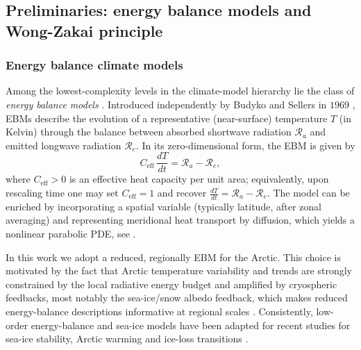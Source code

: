 \documentclass[10pt]{amsart}
\numberwithin{equation}{section}
\begin{document}
\subsection{Preliminaries: energy balance models and Wong-Zakai principle}
\label{subsec: preliminaries}
\subsubsection{Energy balance climate models}
Among the lowest-complexity levels in the climate-model hierarchy lie the class of \emph{energy balance models}
\cite{North17}. Introduced independently by Budyko and Sellers in $1969$ \cite{Budyko1969,Sellers1969}, EBMs describe the evolution of a representative (near-surface) temperature
$T$ (in Kelvin) through the balance between absorbed shortwave radiation $\mathcal{R}_a$ and emitted
longwave radiation $\mathcal{R}_e$. In its zero-dimensional form, the EBM is given by
\begin{equation}
C_{\mathrm{eff}}\,\frac{dT}{dt}=\mathcal{R}_a-\mathcal{R}_e,
    \label{eq: EBM preliminaries}
\end{equation}
where $C_{\mathrm{eff}}>0$ is an effective heat capacity per unit area; equivalently, upon rescaling time one may set
$C_{\mathrm{eff}}=1$ and recover $\frac{dT}{dt}=\mathcal{R}_a-\mathcal{R}_e$. The model can be enriched by incorporating
a spatial variable (typically latitude, after zonal averaging) and representing meridional heat transport
by diffusion, which yields a nonlinear parabolic PDE, see \cite{Ghil1976,North1981}.



In this work we adopt a reduced, regionally EBM for the Arctic. This choice is motivated by the
fact that Arctic temperature variability and trends are strongly constrained by the local radiative energy
budget and amplified by cryospheric feedbacks, most notably the sea-ice/snow albedo feedback, which makes
reduced energy-balance descriptions informative at regional scales \cite{vandeWal,Dortmans}. Consistently, low-order energy-balance and sea-ice models have been adapted for recent studies for sea-ice stability, Arctic warming and ice-loss transitions \cite{Goodwin,Rose,Eisenman}.
\end{document}
